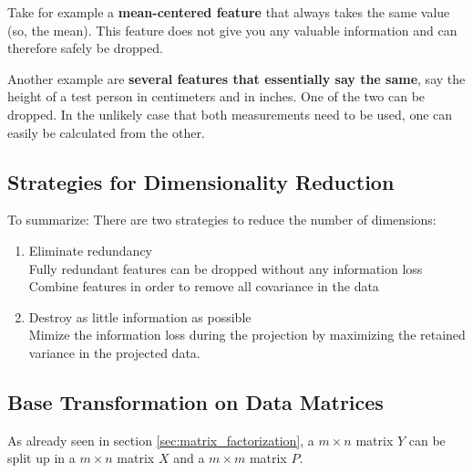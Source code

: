 \documentclass[11pt]{article}
\begin{document}
Take for example a \textbf{mean-centered feature} that always takes the same value (so, the mean). This feature does not give you any valuable information and can therefore safely be dropped.

Another example are \textbf{several features that essentially say the same}, say the height of a test person in centimeters and in inches. One of the two can be dropped. In the unlikely case that both measurements need to be used, one can easily be calculated from the other.


\subsection{Strategies for Dimensionality Reduction} \label{sec:strategies}

To summarize: There are two strategies to reduce the number of dimensions:

\begin{enumerate}
    \item Eliminate redundancy \\
          Fully redundant features can be dropped without any information loss \\
          Combine features in order to remove all covariance in the data
    \item Destroy as little information as possible \\
          Mimize the information loss during the projection by maximizing the retained variance in the projected data.
\end{enumerate}

\subsection{Base Transformation on Data Matrices}

As already seen in section \ref{sec:matrix_factorization}, a $m \times n$ matrix $Y$ can be split up in a $m \times n$ matrix $X$ and a $m \times m$ matrix $P$.
\end{document}
